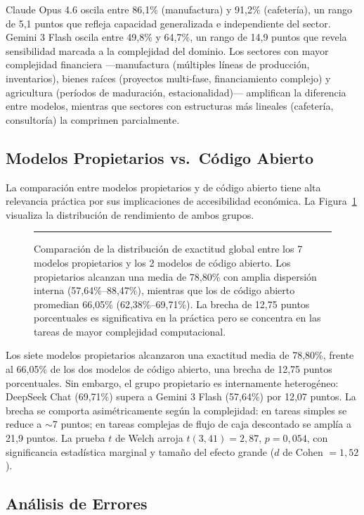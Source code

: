 \documentclass[12pt,a4paper]{article}
\begin{document}
Claude Opus 4.6 oscila entre 86,1\% (manufactura) y 91,2\% (cafetería), un rango de 5,1 puntos que refleja capacidad generalizada e independiente del sector. Gemini 3 Flash oscila entre 49,8\% y 64,7\%, un rango de 14,9 puntos que revela sensibilidad marcada a la complejidad del dominio. Los sectores con mayor complejidad financiera ---manufactura (múltiples líneas de producción, inventarios), bienes raíces (proyectos multi-fase, financiamiento complejo) y agricultura (períodos de maduración, estacionalidad)--- amplifican la diferencia entre modelos, mientras que sectores con estructuras más lineales (cafetería, consultoría) la comprimen parcialmente.

\subsection{Modelos Propietarios vs.\ Código Abierto}

La comparación entre modelos propietarios y de código abierto tiene alta relevancia práctica por sus implicaciones de accesibilidad económica. La Figura~\ref{fig:propietario} visualiza la distribución de rendimiento de ambos grupos.

\begin{figure}[ht]
\centering
\rule{0.9\linewidth}{5cm}
\caption{Comparación de la distribución de exactitud global entre los 7 modelos propietarios y los 2 modelos de código abierto. Los propietarios alcanzan una media de 78,80\% con amplia dispersión interna (57,64\%--88,47\%), mientras que los de código abierto promedian 66,05\% (62,38\%--69,71\%). La brecha de 12,75 puntos porcentuales es significativa en la práctica pero se concentra en las tareas de mayor complejidad computacional.}
\label{fig:propietario}
\end{figure}

Los siete modelos propietarios alcanzaron una exactitud media de 78,80\%, frente al 66,05\% de los dos modelos de código abierto, una brecha de 12,75 puntos porcentuales. Sin embargo, el grupo propietario es internamente heterogéneo: DeepSeek Chat (69,71\%) supera a Gemini 3 Flash (57,64\%) por 12,07 puntos. La brecha se comporta asimétricamente según la complejidad: en tareas simples se reduce a $\sim$7 puntos; en tareas complejas de flujo de caja descontado se amplía a 21,9 puntos. La prueba $t$ de Welch arroja $t(3{,}41) = 2{,}87$, $p = 0{,}054$, con significancia estadística marginal y tamaño del efecto grande ($d$ de Cohen $= 1{,}52$).

\subsection{Análisis de Errores}
\end{document}
